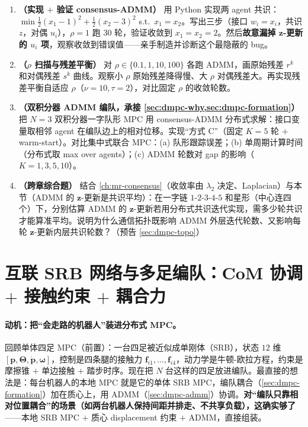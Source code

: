 \begin{exercise}
\begin{enumerate}
  \item \textbf{（实现 $+$ 验证 consensus-ADMM）} 用 Python 实现两 agent 共识：$\min \tfrac12(x_1-1)^2+\tfrac12(x_2-3)^2$ s.t.\ $x_1=x_2$。写出三步（接口 $w_i=x_i$，共识 $z$，对偶 $u_i$），$\rho=1$ 跑 $30$ 轮，验证收敛到 $x_1=x_2=2$。然后\textbf{故意漏掉 $\mathbf{z}$-更新的 $u_i$ 项}，观察收敛到错误值——亲手制造并诊断这个最隐蔽的 bug。
  \item \textbf{（$\rho$ 扫描与残差平衡）} 对 $\rho\in\{0.1,1,10,100\}$ 各跑 ADMM，画原始残差 $r^k$ 和对偶残差 $s^k$ 曲线。观察小 $\rho$ 原始残差降得慢、大 $\rho$ 对偶残差大。再实现残差平衡自适应 $\rho$（$\nu=10,\tau=2$），对比固定 $\rho$ 的收敛轮数。
  \item \textbf{（双积分器 ADMM 编队，承接 \cref{sec:dmpc-why,sec:dmpc-formation}）} 把 $N=3$ 双积分器一字队形 MPC 用 consensus-ADMM 分布式求解：接口变量取相邻 agent 在编队边上的相对位移。实现“方式 C”（固定 $K=5$ 轮 $+$ warm-start）。对比集中式联合 MPC：(a) 队形跟踪误差；(b) 单周期计算时间（分布式取 max over agents）；(c) ADMM 轮数对 gap 的影响（$K=1,3,5,10$）。
  \item \textbf{（跨章综合题）} 结合 \cref{ch:mr-consensus}（收敛率由 $\lambda_2$ 决定、Laplacian）与本节（ADMM 的 $\mathbf{z}$-更新是共识平均）：在一字链 $1$-$2$-$3$-$4$-$5$ 和星形（中心连四个）下，分别估算 ADMM 的 $\mathbf{z}$-更新若用分布式共识迭代实现，需多少轮共识才能算准平均。说明为什么通信拓扑既影响 ADMM 外层迭代轮数、又影响每轮 $\mathbf{z}$-更新内层共识轮数？（预告 \cref{sec:dmpc-topo}）
\end{enumerate}
\end{exercise}

\section{互联 SRB 网络与多足编队：CoM 协调 $+$ 接触约束 $+$ 耦合力}
\label{sec:dmpc-srb}

\paragraph{动机：把“会走路的机器人”装进分布式 MPC。}
回顾单体四足 MPC（前置）：一台四足被近似成单刚体（SRB），状态 $12$ 维 $[\mathbf{p},\boldsymbol{\Theta},\dot{\mathbf{p}},\boldsymbol{\omega}]$，控制是四条腿的接触力 $\mathbf{f}_{i1},\dots,\mathbf{f}_{i4}$，动力学是牛顿-欧拉方程，约束是摩擦锥 $+$ 单边接触 $+$ 踏步时序。现在把 $N$ 台这样的四足放进编队。最直接的想法是：每台机器人的本地 MPC 就是它的单体 SRB MPC，编队耦合（\cref{sec:dmpc-formation}）加在质心上，用 ADMM（\cref{sec:dmpc-admm}）协调。\textbf{对“编队只靠相对位置耦合”的场景（如两台机器人保持间距并排走、不共享负载），这确实够了}——本地 SRB MPC $+$ 质心 displacement 约束 $+$ ADMM，直接组装。

